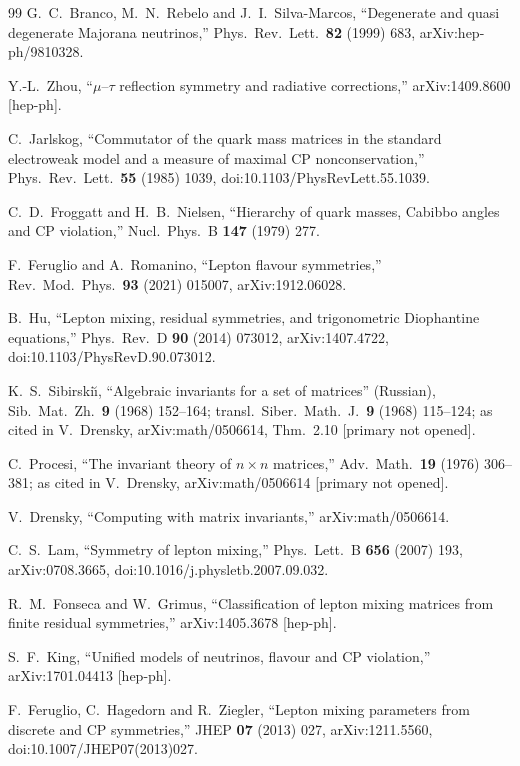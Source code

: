 \documentclass[11pt,a4paper]{article}
\theoremstyle{definition}
\begin{document}
\begin{thebibliography}{99}
 G.\ C.\ Branco, M.\ N.\ Rebelo and J.\ I.\ Silva-Marcos,
``Degenerate and quasi degenerate Majorana neutrinos,''
Phys.\ Rev.\ Lett.\ \textbf{82} (1999) 683, arXiv:hep-ph/9810328.

 Y.-L.\ Zhou, ``$\mu$--$\tau$ reflection symmetry and radiative corrections,''
arXiv:1409.8600 [hep-ph].

 C.\ Jarlskog, ``Commutator of the quark mass matrices in the
standard electroweak model and a measure of maximal CP nonconservation,''
Phys.\ Rev.\ Lett.\ \textbf{55} (1985) 1039, doi:10.1103/PhysRevLett.55.1039.

 C.\ D.\ Froggatt and H.\ B.\ Nielsen, ``Hierarchy of quark
masses, Cabibbo angles and CP violation,'' Nucl.\ Phys.\ B \textbf{147} (1979) 277.

 F.\ Feruglio and A.\ Romanino, ``Lepton flavour symmetries,''
Rev.\ Mod.\ Phys.\ \textbf{93} (2021) 015007, arXiv:1912.06028.

 B.\ Hu, ``Lepton mixing, residual symmetries, and trigonometric
Diophantine equations,'' Phys.\ Rev.\ D \textbf{90} (2014) 073012, arXiv:1407.4722,
doi:10.1103/PhysRevD.90.073012.

 K.\ S.\ Sibirski\u{\i}, ``Algebraic invariants for a set of matrices''
(Russian), Sib.\ Mat.\ Zh.\ \textbf{9} (1968) 152--164; transl.\ Siber.\ Math.\ J.\ \textbf{9} (1968)
115--124; as cited in V.\ Drensky, arXiv:math/0506614, Thm.~2.10 [primary not opened].

 C.\ Procesi, ``The invariant theory of $n\times n$ matrices,'' Adv.\ Math.\
\textbf{19} (1976) 306--381; as cited in V.\ Drensky, arXiv:math/0506614 [primary not opened].

 V.\ Drensky, ``Computing with matrix invariants,'' arXiv:math/0506614.

 C.\ S.\ Lam, ``Symmetry of lepton mixing,'' Phys.\ Lett.\ B \textbf{656}
(2007) 193, arXiv:0708.3665, doi:10.1016/j.physletb.2007.09.032.

 R.\ M.\ Fonseca and W.\ Grimus, ``Classification of lepton mixing
matrices from finite residual symmetries,'' arXiv:1405.3678 [hep-ph].

 S.\ F.\ King, ``Unified models of neutrinos, flavour and CP violation,''
arXiv:1701.04413 [hep-ph].

 F.\ Feruglio, C.\ Hagedorn and R.\ Ziegler, ``Lepton mixing parameters from
discrete and CP symmetries,'' JHEP \textbf{07} (2013) 027, arXiv:1211.5560,
doi:10.1007/JHEP07(2013)027.


\end{thebibliography}
\end{document}
